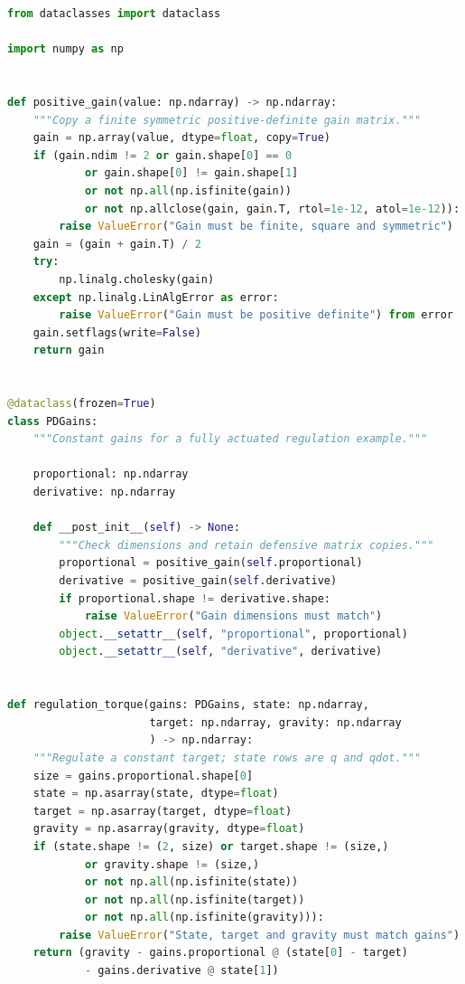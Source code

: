 \begin{lstlisting}[language=Python, caption={Gravity-Compensated Regulation With Explicit Gain Contracts}]
from dataclasses import dataclass

import numpy as np


def positive_gain(value: np.ndarray) -> np.ndarray:
    """Copy a finite symmetric positive-definite gain matrix."""
    gain = np.array(value, dtype=float, copy=True)
    if (gain.ndim != 2 or gain.shape[0] == 0
            or gain.shape[0] != gain.shape[1]
            or not np.all(np.isfinite(gain))
            or not np.allclose(gain, gain.T, rtol=1e-12, atol=1e-12)):
        raise ValueError("Gain must be finite, square and symmetric")
    gain = (gain + gain.T) / 2
    try:
        np.linalg.cholesky(gain)
    except np.linalg.LinAlgError as error:
        raise ValueError("Gain must be positive definite") from error
    gain.setflags(write=False)
    return gain


@dataclass(frozen=True)
class PDGains:
    """Constant gains for a fully actuated regulation example."""

    proportional: np.ndarray
    derivative: np.ndarray

    def __post_init__(self) -> None:
        """Check dimensions and retain defensive matrix copies."""
        proportional = positive_gain(self.proportional)
        derivative = positive_gain(self.derivative)
        if proportional.shape != derivative.shape:
            raise ValueError("Gain dimensions must match")
        object.__setattr__(self, "proportional", proportional)
        object.__setattr__(self, "derivative", derivative)


def regulation_torque(gains: PDGains, state: np.ndarray,
                      target: np.ndarray, gravity: np.ndarray
                      ) -> np.ndarray:
    """Regulate a constant target; state rows are q and qdot."""
    size = gains.proportional.shape[0]
    state = np.asarray(state, dtype=float)
    target = np.asarray(target, dtype=float)
    gravity = np.asarray(gravity, dtype=float)
    if (state.shape != (2, size) or target.shape != (size,)
            or gravity.shape != (size,)
            or not np.all(np.isfinite(state))
            or not np.all(np.isfinite(target))
            or not np.all(np.isfinite(gravity))):
        raise ValueError("State, target and gravity must match gains")
    return (gravity - gains.proportional @ (state[0] - target)
            - gains.derivative @ state[1])
\end{lstlisting}


